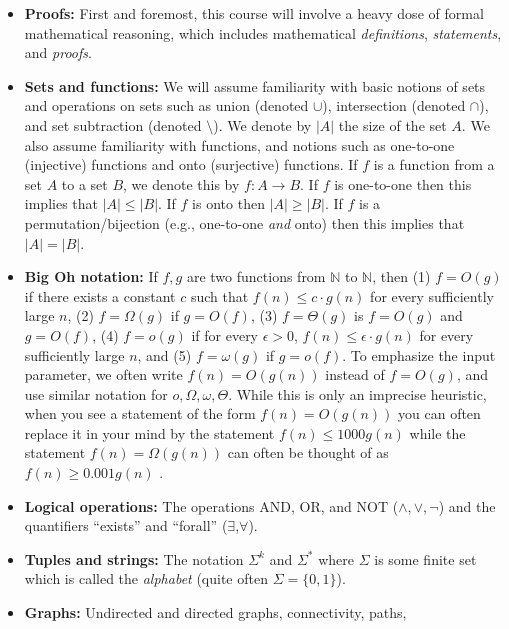 \begin{itemize}
\item
  \textbf{Proofs:} First and foremost, this course will involve a heavy
  dose of formal mathematical reasoning, which includes mathematical
  \emph{definitions}, \emph{statements}, and \emph{proofs}.
\item
  \textbf{Sets and functions:} We will assume familiarity with basic
  notions of sets and operations on sets such as union (denoted
  \(\cup\)), intersection (denoted \(\cap\)), and set subtraction
  (denoted \(\setminus\)). We denote by \(|A|\) the size of the set
  \(A\). We also assume familiarity with functions, and notions such as
  one-to-one (injective) functions and onto (surjective) functions. If
  \(f\) is a function from a set \(A\) to a set \(B\), we denote this by
  \(f:A\rightarrow B\). If \(f\) is one-to-one then this implies that
  \(|A| \leq |B|\). If \(f\) is onto then \(|A| \geq |B|\). If \(f\) is
  a permutation/bijection (e.g., one-to-one \emph{and} onto) then this
  implies that \(|A|=|B|\).
\item
  \textbf{Big Oh notation:} If \(f,g\) are two functions from
  \({\mathbb{N}}\) to \({\mathbb{N}}\), then (1) \(f = O(g)\) if there
  exists a constant \(c\) such that \(f(n) \leq c\cdot g(n)\) for every
  sufficiently large \(n\), (2) \(f = \Omega(g)\) if \(g=O(f)\), (3)
  \(f = \Theta(g)\) is \(f=O(g)\) and \(g=O(f)\), (4) \(f = o(g)\) if
  for every \(\epsilon>0\), \(f(n) \leq \epsilon \cdot g(n)\) for every
  sufficiently large \(n\), and (5) \(f = \omega(g)\) if \(g = o(f)\).
  To emphasize the input parameter, we often write \(f(n) = O(g(n))\)
  instead of \(f = O(g)\), and use similar notation for
  \(o,\Omega,\omega,\Theta\). While this is only an imprecise heuristic,
  when you see a statement of the form \(f(n)=O(g(n))\) you can often
  replace it in your mind by the statement \(f(n) \leq 1000g(n)\) while
  the statement \(f(n) = \Omega(g(n))\) can often be thought of as
  \(f(n)\geq 0.001g(n)\) .
\item
  \textbf{Logical operations:} The operations AND, OR, and NOT
  (\(\wedge,\vee,\neg\)) and the quantifiers ``exists'' and ``forall''
  (\(\exists\),\(\forall\)).
\item
  \textbf{Tuples and strings:} The notation \(\Sigma^k\) and
  \(\Sigma^*\) where \(\Sigma\) is some finite set which is called the
  \emph{alphabet} (quite often \(\Sigma = \{0,1\}\)).
\item
  \textbf{Graphs:} Undirected and directed graphs, connectivity, paths,

\end{itemize}
